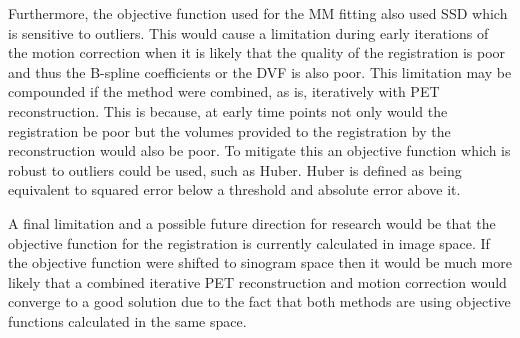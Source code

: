         Furthermore, the objective function used for the \gls{MM} fitting also used \gls{SSD} which is sensitive to outliers. This would cause a limitation during early iterations of the motion correction when it is likely that the quality of the registration is poor and thus the B-spline coefficients or the \gls{DVF} is also poor. This limitation may be compounded if the method were combined, as is, iteratively with \gls{PET} reconstruction. This is because, at early time points not only would the registration be poor but the volumes provided to the registration by the reconstruction would also be poor. To mitigate this an objective function which is robust to outliers could be used, such as Huber. Huber is defined as being equivalent to squared error below a threshold and absolute error above it.
        
        A final limitation and a possible future direction for research would be that the objective function for the registration is currently calculated in image space. If the objective function were shifted to sinogram space then it would be much more likely that a combined iterative \gls{PET} reconstruction and motion correction would converge to a good solution due to the fact that both methods are using objective functions calculated in the same space.
